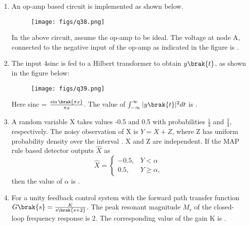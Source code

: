 \documentclass[a4paper, 11pt]{article}
\begin{document}
\begin{enumerate}
    \hfill{}

    \item An op-amp based circuit is implemented as shown below.
    \begin{figure}[H]
        \centering
        \texttt{[image: figs/q38.png]}
        \caption*{}
        \label{fig:q38}
    \end{figure}
    In the above circuit, assume the op-amp to be ideal. The voltage  at node A, connected to the negative input of the op-amp as indicated in the figure is \underline{\hspace{2cm}}.

    \hfill{}

    \item The input 4sinc is fed to a Hilbert transformer to obtain $y\brak{t}$, as shown in the figure below:
    \begin{figure}[H]
        \centering
        \texttt{[image: figs/q39.png]}
        \caption*{}
        \label{fig:q39}
    \end{figure}
    Here sinc = $\frac{\sin\brak{\pi x}}{\pi x}$.
    The value  of $\int_{-\infty}^{\infty} |y\brak{t}|^2 dt$ is \underline{\hspace{2cm}}.

    \hfill{}

    \item A random variable X takes values -0.5 and 0.5 with probabilities $\frac{1}{4}$ and $\frac{3}{4}$, respectively. The noisy observation of X is $Y = X + Z$, where Z has uniform probability density over the interval . X and Z are independent. If the MAP rule based detector outputs $\hat{X}$ as
    \[ \hat{X} = \begin{cases} -0.5, & Y < \alpha \\ 0.5, & Y \ge \alpha, \end{cases} \]
    then the value of $\alpha$  is \underline{\hspace{2cm}}.

    \hfill{}

    \item For a unity feedback control system with the forward path transfer function $G\brak{s} = \frac{K}{s\brak{s+2}}$. The peak resonant magnitude $M_r$ of the closed-loop frequency response is 2. The corresponding value of the gain K  is \underline{\hspace{2cm}}.
    

\end{enumerate}
\end{document}
